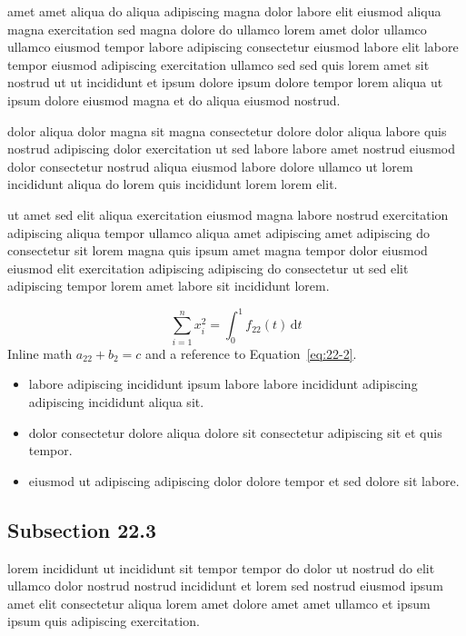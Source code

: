 \documentclass{article}
\begin{document}
amet amet aliqua do aliqua adipiscing magna dolor labore elit eiusmod aliqua magna exercitation sed magna dolore do ullamco lorem amet dolor ullamco ullamco eiusmod tempor labore adipiscing consectetur eiusmod labore elit labore tempor eiusmod adipiscing exercitation ullamco sed sed quis lorem amet sit nostrud ut ut incididunt et ipsum dolore ipsum dolore tempor lorem aliqua ut ipsum dolore eiusmod magna et do aliqua eiusmod nostrud.

dolor aliqua dolor magna sit magna consectetur dolore dolor aliqua labore quis nostrud adipiscing dolor exercitation ut sed labore labore amet nostrud eiusmod dolor consectetur nostrud aliqua eiusmod labore dolore ullamco ut lorem incididunt aliqua do lorem quis incididunt lorem lorem elit.

ut amet sed elit aliqua exercitation eiusmod magna labore nostrud exercitation adipiscing aliqua tempor ullamco aliqua amet adipiscing amet adipiscing do consectetur sit lorem magna quis ipsum amet magna tempor dolor eiusmod eiusmod elit exercitation adipiscing adipiscing do consectetur ut sed elit adipiscing tempor lorem amet labore sit incididunt lorem.

\begin{equation}\label{eq:22-2}
  \sum_{i=1}^{n} x_i^{2} = \int_0^1 f_{22}(t)\,\mathrm{d}t
\end{equation}
Inline math $a_{22} + b_{2} = c$ and a reference to Equation~\eqref{eq:22-2}.

\begin{itemize}
  \item labore adipiscing incididunt ipsum labore labore incididunt adipiscing adipiscing incididunt aliqua sit.
  \item dolor consectetur dolore aliqua dolore sit consectetur adipiscing sit et quis tempor.
  \item eiusmod ut adipiscing adipiscing dolor dolore tempor et sed dolore sit labore.
\end{itemize}

\subsection{Subsection 22.3}\label{sec:22-3}
lorem incididunt ut incididunt sit tempor tempor do dolor ut nostrud do elit ullamco dolor nostrud nostrud incididunt et lorem sed nostrud eiusmod ipsum amet elit consectetur aliqua lorem amet dolore amet amet ullamco et ipsum ipsum quis adipiscing exercitation.
\end{document}
